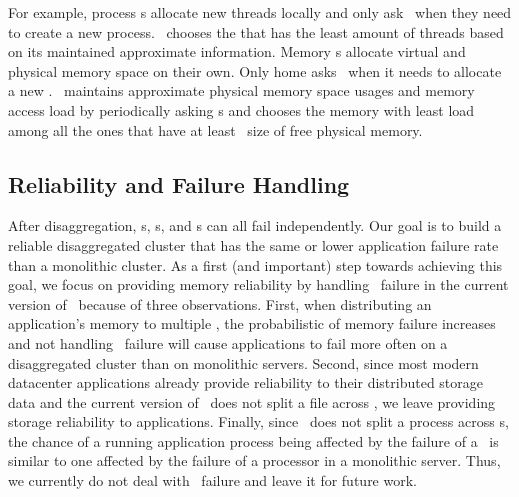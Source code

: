 \documentclass[10pt,times,twocolumn]{z2-article}
\begin{document}
{{{{{{{For example, process \microos{}s allocate new threads locally 
and only ask \gpm\ when they need to create a new process.
\gpm\ chooses the \pcomponent{} that has the least amount of threads based on its maintained approximate information.
Memory \microos{}s allocate virtual and physical memory space on their own.
Only home \mcomponent{} asks \gmm\ when it needs to allocate a new \vregion.
\gmm\ maintains approximate physical memory space usages and memory access load by periodically asking \mcomponent{}s
and chooses the memory with least load among all the ones that have at least \vregion\ size of free physical memory.


\subsection{Reliability and Failure Handling}
\label{sec:failure}
After disaggregation, \pcomponent{}s, \mcomponent{}s, and \scomponent{}s can all fail independently.
Our goal is to build a reliable disaggregated cluster that has the same or lower application failure rate
than a monolithic cluster.
As a first (and important) step towards achieving this goal, %
we focus on providing memory reliability by handling \mcomponent\ failure in the current version of \lego\ because of three observations.
First, when distributing an application's memory to multiple \mcomponent, 
the probabilistic of memory failure increases and not handling \mcomponent\ failure will cause applications to fail more often 
on a disaggregated cluster than on monolithic servers.
Second, since most modern datacenter applications
already provide reliability to their distributed storage data %
and the current version of \lego\ does not split a file across \scomponent,
we leave providing storage reliability to applications.
Finally, since \lego\ does not split a process across \pcomponent{}s,
the chance of a running application process being affected by the failure of a \pcomponent\ is similar to 
one affected by the failure of a processor in a monolithic server.
Thus, we currently do not deal with \pcomponent\ failure and leave it for future work.

}}}}}}}
\end{document}
